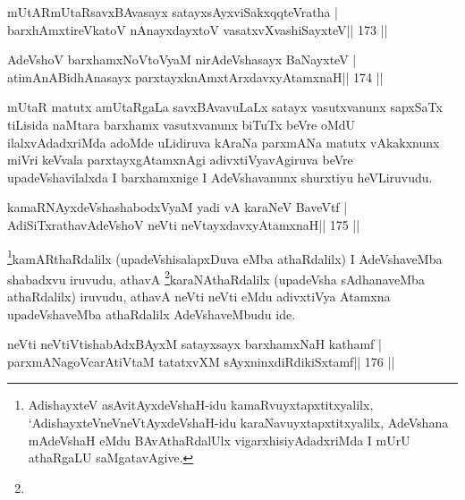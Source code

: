 
\begin{shl}
mUtARmUtaRsavxBAvasayx satayxsAyx\s\s viSakxqqteVratha |
barxhAmxtireVkatoV nAnayxdayxtoV vasatxvXvashiSayxteV\hfill || 173 ||
\end{shl}

\begin{shl}
AdeVshoV barxhamxNoV\s toV\s yaM nirAdeVshasayx BaNayxteV |
atimAnABidhAnasayx parxtayxknAmxtArxdavxyAtamxnaH\hfill || 174 ||
\end{shl}

\begin{artha}
mUtaR matutx amUtaRgaLa savxBAvavuLaLx satayx vasutxvanunx sapxSaTx tiLisida naMtara barxhamx vasutxvanunx biTuTx beVre oMdU ilalxvAdadxriMda adoMde uLidiruva kAraNa parxmANa matutx vAkakxnunx miVri keVvala parxtayxgAtamxnAgi adivxtiVyavAgiruva beVre upadeVshavilalxda I barxhamxnige I AdeVshavanunx shurxtiyu heVLiruvudu.
\end{artha}



\begin{shl}
kamaRNAyxdeVshashabodxV\s yaM yadi vA karaNeV BaveVtf |
AdiSiTxrathavA\s\s deVshoV neVti neVtayxdavxyAtamxnaH\hfill || 175 ||
\end{shl}

\begin{artha}
\footnote{AdishayxteV asAvitAyxdeVshaH-idu kamaRvuyxtapxtitxyalilx,
  `AdishayxteV\s neVneVtAyxdeVshaH-idu karaNavuyxtapxtitxyalilx,
  AdeVshana mAdeVshaH eMdu BAvAthaRdalUlx vigarxhisiyAdadxriMda I
  mUrU athaRgaLU saMgatavAgive.}kamARthaRdalilx (upadeVshisalapxDuva eMba athaRdalilx) I
AdeVshaveMba shabadxvu iruvudu, athavA \footnote{}karaNAthaRdalilx
(upadeVsha sAdhanaveMba athaRdalilx) iruvudu, athavA neVti neVti eMdu
adivxtiVya Atamxna upadeVshaveMba athaRdalilx AdeVshaveMbudu ide.
\end{artha}


\begin{shl}
neVti neVtiVtishabAdxBAyxM satayxsayx barxhamxNaH kathamf |
parxmANagoVcarAtiVtaM tatatxvXM sAyxninxdiRdikiSxtamf\hfill || 176 ||
\end{shl}

